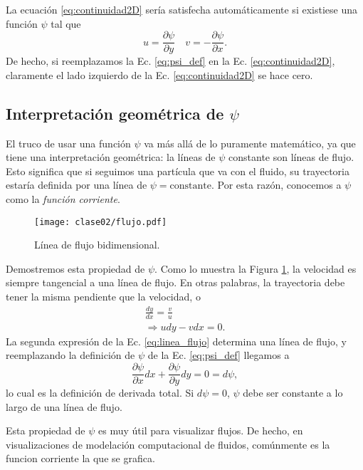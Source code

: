 La ecuación \eqref{eq:continuidad2D} sería satisfecha automáticamente si existiese una función $\psi$ tal que
%
\begin{equation} \label{eq:psi_def}
u = \frac{\partial \psi}{\partial y} \quad v = -\frac{\partial \psi}{\partial x}.
\end{equation}
%
De hecho, si reemplazamos la Ec. \eqref{eq:psi_def} en la Ec. \eqref{eq:continuidad2D}, claramente el lado izquierdo de la Ec. \eqref{eq:continuidad2D} se hace cero.

\subsection*{Interpretación geométrica de $\psi$}
El truco de usar una función $\psi$ va más allá de lo puramente matemático, ya que tiene una interpretación geométrica: la líneas de $\psi$ constante son líneas de flujo.
Esto significa que si seguimos una partícula que va con el fluido, su trayectoria estaría definida por una línea de $\psi =\text{constante}$.
Por esta razón, conocemos a $\psi$ como la \emph{función corriente}.

\begin{figure}[!h]
\centering
\texttt{[image: clase02/flujo.pdf]}
\caption{Línea de flujo bidimensional.}
\label{fig:flujo}
\end{figure}

Demostremos esta propiedad de $\psi$.
Como lo muestra la Figura \ref{fig:flujo}, la velocidad es siempre tangencial a una línea de flujo. 
En otras palabras, la trayectoria debe tener la misma pendiente que la velocidad, o
%
\begin{align}\label{eq:linea_flujo}
\frac{dy}{dx} = \frac{v}{u} \nonumber \\
\Rightarrow udy - vdx = 0.
\end{align}
%
La segunda expresión de la Ec. \eqref{eq:linea_flujo} determina una línea de flujo, y reemplazando la definición de $\psi$ de la Ec. \eqref{eq:psi_def} llegamos a
%
\begin{equation}
\frac{\partial\psi}{\partial x} dx + \frac{\partial \psi}{\partial y}dy = 0 = d\psi,
\end{equation}
%
lo cual es la definición de derivada total.
Si $d\psi=0$, $\psi$ debe ser constante a lo largo de una línea de flujo.

Esta propiedad de $\psi$ es muy útil para visualizar flujos.
De hecho, en visualizaciones de modelación computacional de fluidos, comúnmente es la funcion corriente la que se grafica.


